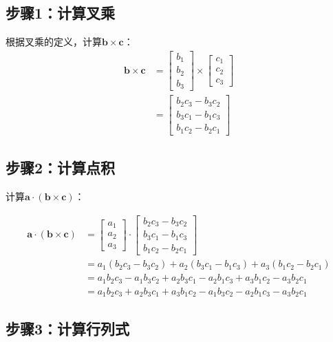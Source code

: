 \documentclass[12pt,a4paper]{article}
\begin{document}
\subsection{步骤1：计算叉乘}

根据叉乘的定义，计算$\bm{b} \times \bm{c}$：
\begin{align}
\bm{b} \times \bm{c} &= \begin{bmatrix} b_1 \\ b_2 \\ b_3 \end{bmatrix} \times \begin{bmatrix} c_1 \\ c_2 \\ c_3 \end{bmatrix} \\
&= \begin{bmatrix} b_2 c_3 - b_3 c_2 \\ b_3 c_1 - b_1 c_3 \\ b_1 c_2 - b_2 c_1 \end{bmatrix}
\end{align}

\subsection{步骤2：计算点积}

计算$\bm{a} \cdot (\bm{b} \times \bm{c})$：

\begin{align}
\bm{a} \cdot (\bm{b} \times \bm{c}) &= \begin{bmatrix} a_1 \\ a_2 \\ a_3 \end{bmatrix} \cdot \begin{bmatrix} b_2 c_3 - b_3 c_2 \\ b_3 c_1 - b_1 c_3 \\ b_1 c_2 - b_2 c_1 \end{bmatrix} \\
&= a_1(b_2 c_3 - b_3 c_2) + a_2(b_3 c_1 - b_1 c_3) + a_3(b_1 c_2 - b_2 c_1) \\
&= a_1 b_2 c_3 - a_1 b_3 c_2 + a_2 b_3 c_1 - a_2 b_1 c_3 + a_3 b_1 c_2 - a_3 b_2 c_1 \\
&= a_1 b_2 c_3 + a_2 b_3 c_1 + a_3 b_1 c_2 - a_1 b_3 c_2 - a_2 b_1 c_3 - a_3 b_2 c_1
\label{eq:dot_cross_expanded}
\end{align}

\subsection{步骤3：计算行列式}
\end{document}
